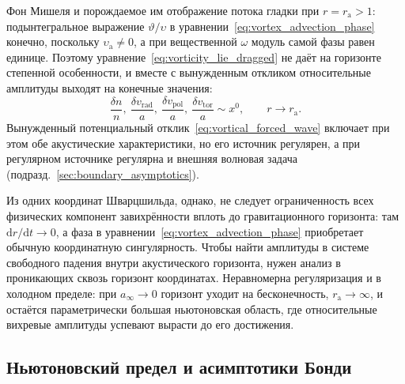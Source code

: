 \documentclass[12pt,a4paper,preprint,nopreprintline]{elsarticle}
\begin{document}
Фон Мишеля и порождаемое им отображение потока гладки при $r=r_{\mathrm{a}}>1$: подынтегральное выражение $\vartheta/\upsilon$ в уравнении~\eqref{eq:vortex_advection_phase} конечно, поскольку $\upsilon_{\mathrm{a}}\neq0$, а при вещественной $\omega$ модуль самой фазы равен единице. Поэтому уравнение~\eqref{eq:vorticity_lie_dragged} не даёт на горизонте степенной особенности, и вместе с вынужденным откликом относительные амплитуды выходят на конечные значения:
\begin{equation}
    \frac{\delta n}{n},\
    \frac{\delta v_{\mathrm{rad}}}{a},\
    \frac{\delta v_{\mathrm{pol}}}{a},\
    \frac{\delta v_{\mathrm{tor}}}{a}
    \sim x^{0},
    \qquad
    r \rightarrow r_{\mathrm{a}}.
    \label{eq:michel_vortex_horizon_asymptotics}
\end{equation}
Вынужденный потенциальный отклик~\eqref{eq:vortical_forced_wave} включает при этом обе акустические характеристики, но его источник регулярен, а при регулярном источнике регулярна и внешняя волновая задача (подразд.~\ref{sec:boundary_asymptotics}).

Из одних координат Шварцшильда, однако, не следует ограниченность всех физических компонент завихрённости вплоть до гравитационного горизонта: там $\mathrm{d}r/\mathrm{d}t\rightarrow0$, а фаза в уравнении~\eqref{eq:vortex_advection_phase} приобретает обычную координатную сингулярность. Чтобы найти амплитуды в системе свободного падения внутри акустического горизонта, нужен анализ в проникающих сквозь горизонт координатах. Неравномерна регуляризация и в холодном пределе: при $a_{\infty}\rightarrow0$ горизонт уходит на бесконечность, $r_{\mathrm{a}}\rightarrow\infty$, и остаётся параметрически большая ньютоновская область, где относительные вихревые амплитуды успевают вырасти до его достижения.

\subsection{Ньютоновский предел и асимптотики Бонди}
\label{sec:newtonian_bondi_vortical}
\end{document}
